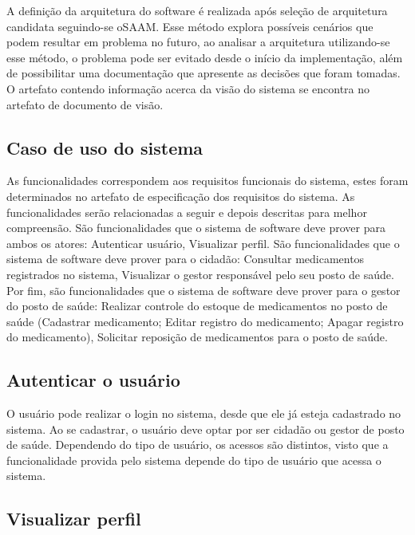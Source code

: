 %

A definição da arquitetura do software é realizada após seleção de arquitetura candidata seguindo-se o\acrfull{SAAM}. Esse método explora possíveis cenários que podem resultar em problema no futuro, ao analisar a arquitetura utilizando-se esse método, o problema pode ser evitado desde o início da implementação, além de possibilitar uma documentação que apresente as decisões que foram tomadas. O artefato contendo informação acerca da visão do sistema se encontra no artefato de documento de visão.

\subsection{Caso de uso do sistema}

As funcionalidades correspondem aos requisitos funcionais do sistema, estes foram determinados no artefato de especificação dos requisitos do sistema. As funcionalidades serão relacionadas a seguir e depois descritas para melhor compreensão. São funcionalidades que o sistema de software deve prover para ambos os atores: Autenticar usuário, Visualizar perfil. São  funcionalidades que o sistema de software deve prover para o cidadão: Consultar medicamentos registrados no sistema, Visualizar o gestor responsável pelo seu posto de saúde. Por fim, são  funcionalidades que o sistema de software deve prover para o gestor do posto de saúde: Realizar controle do estoque de medicamentos no posto de saúde (Cadastrar medicamento; Editar registro do medicamento; Apagar registro do medicamento), Solicitar reposição de medicamentos para o posto de saúde.

\subsection{Autenticar o usuário}

O usuário pode realizar o login no sistema, desde que ele já esteja cadastrado no sistema. Ao se cadastrar, o usuário deve optar por ser cidadão ou gestor de posto de saúde. Dependendo do tipo de usuário, os acessos são distintos, visto que a funcionalidade provida pelo sistema depende do tipo de usuário que acessa o sistema.

\subsection{Visualizar perfil}

